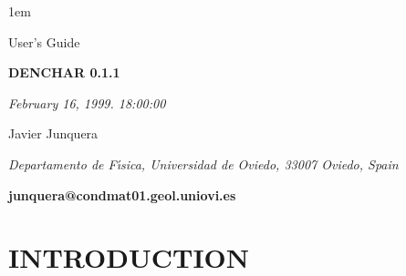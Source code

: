 %
%



\textheight 22cm
\textwidth 16cm
\oddsidemargin 1mm
\topmargin -15mm

\baselineskip=14pt
\parskip 5pt
\parindent 1em




\begin{titlepage}

\begin{center}

\vspace{1cm}

{\huge {\sc User's Guide}}

\vspace{4cm}

{\Huge {\bf DENCHAR 0.1.1} }

\vspace{3cm}

{\Large {\it February 16, 1999. 18:00:00} }

\vspace{3cm}

{\Large Javier Junquera}

\vspace{5pt}

{\it Departamento de F\'{\i}sica, Universidad de
Oviedo, 33007 Oviedo, Spain}

\vspace{7mm}

\vspace{3cm}
{\bf junquera@condmat01.geol.uniovi.es}

\end{center}

\end{titlepage}


\tableofcontents

\newpage



\section{INTRODUCTION}

